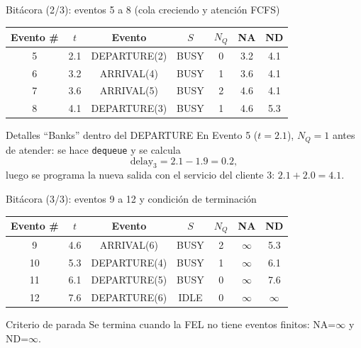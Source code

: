 \documentclass[aspectratio=1610, 9pt]{beamer}
\begin{document}
\begin{frame}{Bitácora (2/3): eventos 5 a 8 (cola creciendo y atención FCFS)}
\small
\setlength{\tabcolsep}{4pt}
\renewcommand{\arraystretch}{1.15}
\begin{table}
\centering
\scriptsize
\begin{tabular}{@{}c c c c c c c@{}}
\toprule
Evento \# & $t$ & Evento & $S$ & $N_Q$ & NA & ND\\
\midrule
5 & 2.1 & DEPARTURE(2) & BUSY & 0 & 3.2 & 4.1\\
6 & 3.2 & ARRIVAL(4) & BUSY & 1 & 3.6 & 4.1\\
7 & 3.6 & ARRIVAL(5) & BUSY & 2 & 4.6 & 4.1\\
8 & 4.1 & DEPARTURE(3) & BUSY & 1 & 4.6 & 5.3\\
\bottomrule
\end{tabular}
\end{table}

\vspace{4pt}
\begin{block}{Detalles “Banks” dentro del DEPARTURE}
En Evento 5 ($t{=}2.1$), $N_Q{=}1$ antes de atender: se hace \texttt{dequeue} y se calcula
\[
\text{delay}_{3}=2.1-1.9=0.2,
\]
luego se programa la nueva salida con el servicio del cliente 3: $2.1+2.0=4.1$.
\end{block}
\end{frame}

\begin{frame}{Bitácora (3/3): eventos 9 a 12 y condición de terminación}
\small
\setlength{\tabcolsep}{4pt}
\renewcommand{\arraystretch}{1.15}
\begin{table}
\centering
\scriptsize
\begin{tabular}{@{}c c c c c c c@{}}
\toprule
Evento \# & $t$ & Evento & $S$ & $N_Q$ & NA & ND\\
\midrule
9  & 4.6 & ARRIVAL(6)   & BUSY & 2 & $\infty$ & 5.3\\
10 & 5.3 & DEPARTURE(4) & BUSY & 1 & $\infty$ & 6.1\\
11 & 6.1 & DEPARTURE(5) & BUSY & 0 & $\infty$ & 7.6\\
12 & 7.6 & DEPARTURE(6) & IDLE & 0 & $\infty$ & $\infty$\\
\bottomrule
\end{tabular}
\end{table}

\vspace{4pt}
\begin{alertblock}{Criterio de parada}
Se termina cuando la FEL no tiene eventos finitos: NA=$\infty$ y ND=$\infty$.
\end{alertblock}
\end{frame}
\end{document}
